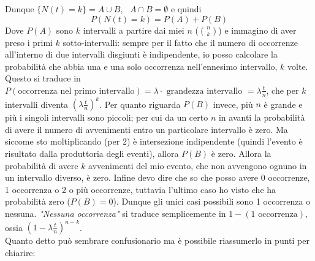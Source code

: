 \documentclass[11pt]{report}
\begin{document}
Dunque $\{N(t)=k\} = A \cup B,\ \ \ A \cap B = \emptyset$ e quindi
\begin{equation}
	P(N(t)=k) = P(A) + P(B)
\end{equation}
Dove $P(A)$ sono $k$ intervalli a partire dai miei $n$ ($\binom{n}{k}$) e immagino di aver preso i primi $k$ sotto-intervalli: sempre per il fatto che il numero di occorrenze all'interno di due intervalli disgiunti è indipendente, io posso calcolare la probabilità che abbia una e una solo occorrenza nell'ennesimo intervallo, $k$ volte. Questo si traduce in $P(\text{occorrenza nel primo intervallo}) = \lambda \cdot \text{ grandezza intervallo } = \lambda \frac{t}{n}$, che per $k$ intervalli diventa $\left( \lambda \frac{t}{n} \right)^k$. Per quanto riguarda $P(B)$ invece, più $n$ è grande e più i singoli intervalli sono piccoli; per cui da un certo $n$ in avanti la probabilità di avere il numero di avvenimenti entro un particolare intervallo è zero. Ma siccome sto moltiplicando (per 2) è intersezione indipendente (quindi l'evento è risultato dalla produttoria degli eventi), allora $P(B)$ è zero. Allora la probabilità di avere $k$ avvenimenti del mio evento, che non avvengono ognuno in un intervallo diverso, è zero. Infine devo dire che so che posso avere 0 occorrenze, 1 occorrenza o 2 o più occorrenze, tuttavia l'ultimo caso ho visto che ha probabilità zero ($P(B)=0$). Dunque gli unici casi possibili sono 1 occorrenza o nessuna. \textit{"Nessuna occorrenza"} si traduce semplicemente in $1 - (\text{1 occorrenza})$, ossia $\left( 1 - \lambda \frac{t}{n} \right)^{n-k}$.\\
Quanto detto può sembrare confusionario ma è possibile riassumerlo in punti per chiarire:
\end{document}
